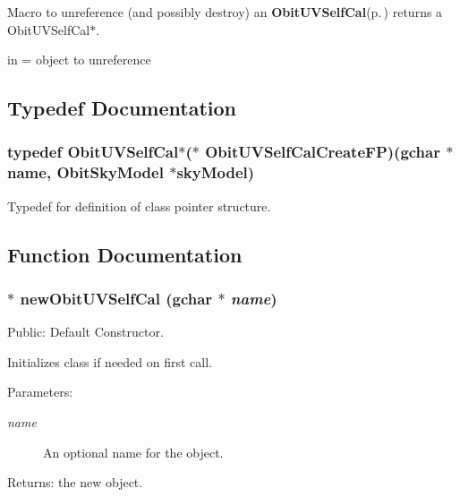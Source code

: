 Macro to unreference (and possibly destroy) an {\bf Obit\-UVSelf\-Cal}{\rm (p.\,\pageref{structObitUVSelfCal})} returns a Obit\-UVSelf\-Cal$\ast$. 

in = object to unreference 

\subsection{Typedef Documentation}
\subsubsection{\setlength{\rightskip}{0pt plus 5cm}typedef {\bf Obit\-UVSelf\-Cal}$\ast$($\ast$ {\bf Obit\-UVSelf\-Cal\-Create\-FP})(gchar $\ast$name, {\bf Obit\-Sky\-Model} $\ast$sky\-Model)}\label{ObitUVSelfCal_8h_a3}


Typedef for definition of class pointer structure. 



\subsection{Function Documentation}
\subsubsection{$\ast$ new\-Obit\-UVSelf\-Cal (gchar $\ast$ {\em name})}\label{ObitUVSelfCal_8h_a5}


Public: Default Constructor. 

Initializes class if needed on first call. \begin{Desc}
\item[Parameters:]
\begin{description}
\item[{\em name}]An optional name for the object. \end{description}
\end{Desc}
\begin{Desc}
\item[Returns:]the new object. \end{Desc}
